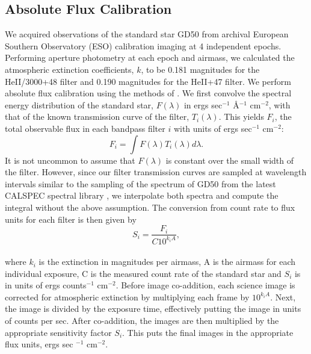 \documentclass[twocolumn]{aastex62}
\begin{document}
\subsection{Absolute Flux Calibration}
We acquired observations of the standard star GD50 from archival European Southern Observatory (ESO) calibration imaging at 4 independent epochs. Performing aperture photometry at each epoch and airmass, we calculated the atmospheric extinction coefficients, $k$, to be 0.181 magnitudes for the HeII/3000+48 filter and 0.190 magnitudes for the HeII+47 filter. 
We perform absolute flux calibration using the methods of \cite{Jacoby1987}. We first convolve the spectral energy distribution of the standard star, $F(\lambda)$ in ergs sec$^{-1}$ \AA$^{-1}$ cm$^{-2}$, with that of the known transmission curve of the filter, $T_{i}(\lambda)$. This yields $F_i$, the total observable flux in each bandpass filter $i$ with units of ergs sec$^{-1}$ cm$^{-2}$:
\begin{equation*}
F_{i}=\int F(\lambda)T_{i}(\lambda)d\lambda.
\end{equation*}
It is not uncommon to assume that $F(\lambda)$ is constant over the small width of the filter. 
However, since our filter transmission curves are sampled at wavelength intervals similar to the sampling of the spectrum of GD50 from the latest CALSPEC spectral library \citep{Bohlin2017}, we interpolate both spectra and compute the integral without the above assumption. 
The conversion from count rate to flux units for each filter is then given by
\begin{equation*}
S_{i}=\dfrac{F_{i}}{C10^{k_{i}A}},
\end{equation*}\\
where $k_i$ is the extinction in magnitudes per airmass, A is the airmass for each individual exposure, C is the measured count rate of the standard star and $S_i$ is in units of ergs counts$^{-1}$ cm$^{-2}$. Before image co-addition, each science image is corrected for atmospheric extinction by multiplying each frame by $10^{k_{i}A}$. Next, the image is divided by the exposure time, effectively putting the image in units of counts per sec. After co-addition, the images are then multiplied by the appropriate sensitivity factor $S_{i}$. This puts the final images in the appropriate flux units, ergs sec $^{-1}$ cm$^{-2}$.
\end{document}
